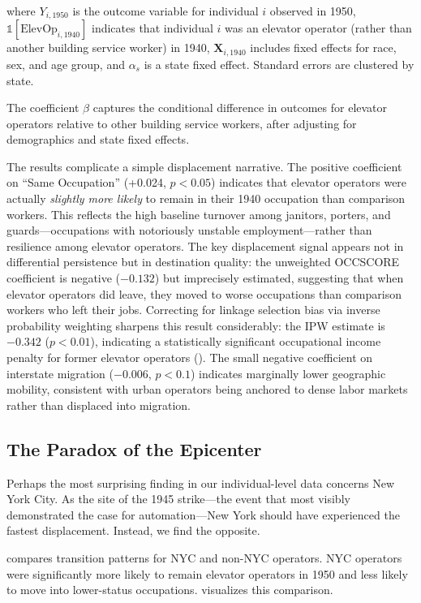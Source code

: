 \documentclass[12pt]{article}
\begin{document}
where $Y_{i,1950}$ is the outcome variable for individual $i$ observed in 1950, $\mathbb{1}[\text{ElevOp}_{i,1940}]$ indicates that individual $i$ was an elevator operator (rather than another building service worker) in 1940, $\mathbf{X}_{i,1940}$ includes fixed effects for race, sex, and age group, and $\alpha_s$ is a state fixed effect. Standard errors are clustered by state.



The coefficient $\beta$ captures the conditional difference in outcomes for elevator operators relative to other building service workers, after adjusting for demographics and state fixed effects.

The results complicate a simple displacement narrative. The positive coefficient on ``Same Occupation'' (+0.024, $p < 0.05$) indicates that elevator operators were actually \emph{slightly more likely} to remain in their 1940 occupation than comparison workers. This reflects the high baseline turnover among janitors, porters, and guards---occupations with notoriously unstable employment---rather than resilience among elevator operators. The key displacement signal appears not in differential persistence but in destination quality: the unweighted OCCSCORE coefficient is negative ($-0.132$) but imprecisely estimated, suggesting that when elevator operators did leave, they moved to worse occupations than comparison workers who left their jobs. Correcting for linkage selection bias via inverse probability weighting sharpens this result considerably: the IPW estimate is $-0.342$ ($p < 0.01$), indicating a statistically significant occupational income penalty for former elevator operators (). The small negative coefficient on interstate migration ($-0.006$, $p < 0.1$) indicates marginally lower geographic mobility, consistent with urban operators being anchored to dense labor markets rather than displaced into migration.

\subsection{The Paradox of the Epicenter}

Perhaps the most surprising finding in our individual-level data concerns New York City. As the site of the 1945 strike---the event that most visibly demonstrated the case for automation---New York should have experienced the fastest displacement. Instead, we find the opposite.

 compares transition patterns for NYC and non-NYC operators. NYC operators were significantly more likely to remain elevator operators in 1950 and less likely to move into lower-status occupations.  visualizes this comparison.
\end{document}
